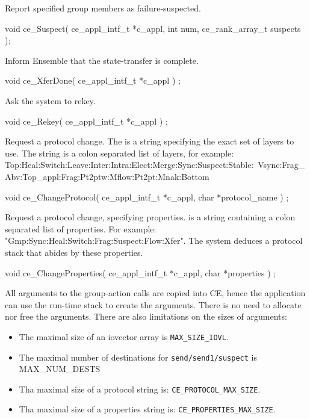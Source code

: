  Report specified group members as failure-suspected.
\begin{codebox}
void ce_Suspect(
    ce_appl_intf_t *c_appl,
    int num,
    ce_rank_array_t suspects
);
\end{codebox}
	
Inform Ensemble that the state-transfer is complete. 
\begin{codebox}
void ce_XferDone(
    ce_appl_intf_t *c_appl
) ;
\end{codebox}

Ask the system to rekey.
\begin{codebox}
void ce_Rekey(
    ce_appl_intf_t *c_appl
) ;
\end{codebox}


Request a protocol change.  The  is a string
specifying the exact set of layers to use. The string is a colon
separated list of layers, for example:
Top:Heal:Switch:Leave:Inter:Intra:Elect:Merge:Sync:Suspect:Stable:\
Vsync:Frag\_Abv:Top\_appl:Frag:Pt2ptw:Mflow:Pt2pt:Mnak:Bottom
\begin{codebox}
void ce_ChangeProtocol(
    ce_appl_intf_t *c_appl,
    char *protocol_name
) ;
\end{codebox}


Request a protocol change, specifying properties.
 is a string containing a colon separated list of
properties. For example:
"Gmp:Sync:Heal:Switch:Frag:Suspect:Flow:Xfer".
The system deduces a protocol stack that abides by these properties.
\begin{codebox}
void ce_ChangeProperties(
    ce_appl_intf_t *c_appl,
    char *properties
) ;
\end{codebox}

All arguments to the group-action calls are copied into CE, hence the
application can use the run-time stack to create the arguments. There
is no need to allocate nor free the arguments. There are also
limitations on the sizes of arguments: 
\begin{itemize}
\item The maximal size of an iovector array is {\tt MAX\_SIZE\_IOVL}.
\item The maximal number of destinations for {\tt send/send1/suspect}
  is MAX\_NUM\_DESTS
\item Tha maximal size of a protocol string is: {\tt CE\_PROTOCOL\_MAX\_SIZE}.
\item Tha maximal size of a properties string is: {\tt CE\_PROPERTIES\_MAX\_SIZE}.
\end{itemize}

